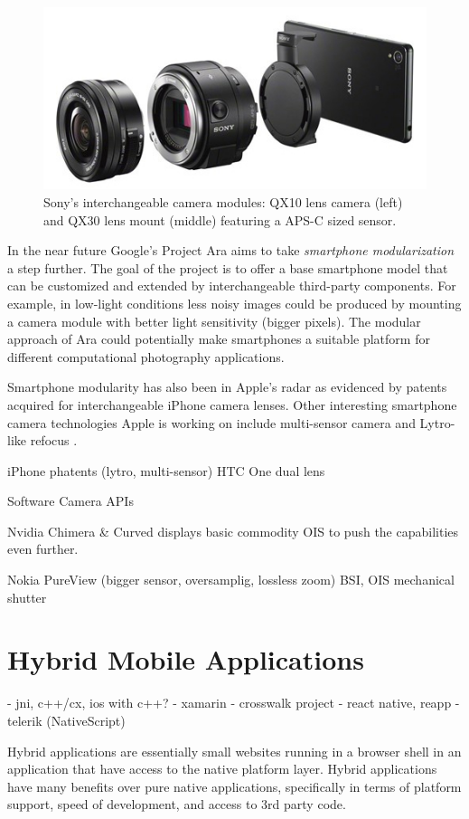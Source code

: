 \documentclass[thesis.tex]{subfiles}
\begin{document}
\begin{figure}[ht]
\centering \includegraphics[width=\textwidth]{images/sony_qx.jpg}
\caption{Sony's interchangeable camera modules: QX10 lens camera (left) and QX30 lens mount (middle) featuring a APS-C sized sensor.\label{figure:sony-qx}}
\end{figure}

In the near future Google's Project Ara aims to take \textit{smartphone modularization} a step further. The goal of the project is to offer a base smartphone model that can be customized and extended by interchangeable third-party components. For example, in low-light conditions less noisy images could be produced by mounting a camera module with better light sensitivity (bigger pixels). The modular approach of Ara could potentially make smartphones a suitable platform for different computational photography applications.

Smartphone modularity has also been in Apple's radar as evidenced by patents \cite{apple_patent_camera_module_3}\cite{apple_patent_camera_module_4}\cite{apple_patent_camera_module_5} acquired for interchangeable iPhone camera lenses. Other interesting smartphone camera technologies Apple is working on include multi-sensor camera and Lytro-like refocus \cite{apple_patent_camera_module_1}\cite{apple_patent_camera_module_2}.

iPhone phatents (lytro, multi-sensor)
HTC One dual lens


Software
Camera APIs

Nvidia Chimera \& Curved displays
basic commodity OIS
to push the capabilities even further.

Nokia PureView (bigger sensor, oversamplig, lossless zoom)
BSI, OIS mechanical shutter

\section{Hybrid Mobile Applications}
- jni, c++/cx, ios with c++?
- xamarin
- crosswalk project
- react native, reapp
- telerik (NativeScript)

Hybrid applications are essentially small websites running in a browser shell in an application that have access to the native platform layer. Hybrid applications have many benefits over pure native applications, specifically in terms of platform support, speed of development, and access to 3rd party code.
\end{document}

